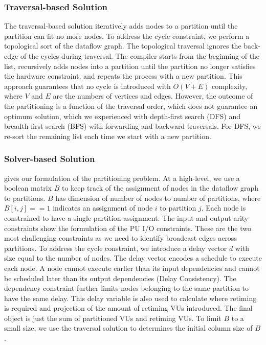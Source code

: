 \subsubsection{Traversal-based Solution}
The traversal-based solution iteratively adds nodes to a partition until the partition can fit no
more nodes.
To address the cycle constraint, we perform a topological sort of the dataflow graph.
The topological traversal ignores the back-edge of the cycles during traversal. 
The compiler starts from the beginning of the list, recursively adds nodes into a partition until the partition no longer satisfies the hardware constraint, and repeats the process with a new partition.
This approach guarantees that no cycle is introduced with $O(V+E)$ complexity, where $V$ and $E$ are the numbers of vertices and edges.
However, the outcome of the partitioning is a function of the traversal order, which does not guarantee an optimum solution, which we experienced with depth-first search (DFS) and breadth-first search (BFS) with forwarding and backward traversals.
For DFS, we re-sort the remaining list each time we start with a new partition.


\subsubsection{Solver-based Solution}
 gives our formulation of the partitioning problem.
At a high-level, we use a boolean matrix $B$ to keep track of the assignment of nodes in the dataflow graph to partitions. 
$B$ has dimension of number of nodes to number of partitions, where$B[i,j]==1$ indicates an assignment of node $i$ to partition $j$. 
Each node is constrained to have a single partition assignment.
The input and output arity constraints show the formulation of the PU I/O constraints.
These are the two most challenging constraints as we need to identify broadcast edges across partitions.
To address the cycle constraint, we introduce a delay vector $d$ with size equal to the number of nodes. 
The delay vector encodes a schedule to execute each node. 
A node cannot execute earlier than its input dependencies and cannot be scheduled later than its output dependencies (Delay Consistency).
The dependency constraint further limits nodes belonging to the same partition to have the same delay.
This delay variable is also used to calculate where retiming is required and projection of the amount of retiming VUs introduced. 
The final object is just the sum of partitioned VUs and retiming VUs.
To limit $B$ to a small size, we use the traversal solution to determines the initial column size of $B$.

